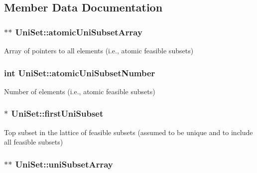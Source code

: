 \subsection{Member Data Documentation}
\hypertarget{classUniSet_a16746d02b5503c5d8c62fe4dff46c5b3}{
\subsubsection[{atomic\-Uni\-Subset\-Array}]{$\ast$$\ast$ Uni\-Set\-::atomic\-Uni\-Subset\-Array\hspace{0.3cm}{\ttfamily [protected]}}}\label{classUniSet_a16746d02b5503c5d8c62fe4dff46c5b3}
Array of pointers to all elements (i.\-e., atomic feasible subsets) \hypertarget{classUniSet_addac67921c058dc9ffa2074b3d59151f}{
\subsubsection[{atomic\-Uni\-Subset\-Number}]{\setlength{\rightskip}{0pt plus 5cm}int Uni\-Set\-::atomic\-Uni\-Subset\-Number\hspace{0.3cm}{\ttfamily [protected]}}}\label{classUniSet_addac67921c058dc9ffa2074b3d59151f}
Number of elements (i.\-e., atomic feasible subsets) \hypertarget{classUniSet_a8b2ca464176feddcd8d96c75514eba6b}{
\subsubsection[{first\-Uni\-Subset}]{$\ast$ Uni\-Set\-::first\-Uni\-Subset\hspace{0.3cm}{\ttfamily [protected]}}}\label{classUniSet_a8b2ca464176feddcd8d96c75514eba6b}
Top subset in the lattice of feasible subsets (assumed to be unique and to include all feasible subsets) \hypertarget{classUniSet_a154ae422d9f248c8b50f39d575f9b3c0}{
\subsubsection[{uni\-Subset\-Array}]{$\ast$$\ast$ Uni\-Set\-::uni\-Subset\-Array\hspace{0.3cm}{\ttfamily [protected]}}}\label{classUniSet_a154ae422d9f248c8b50f39d575f9b3c0}
